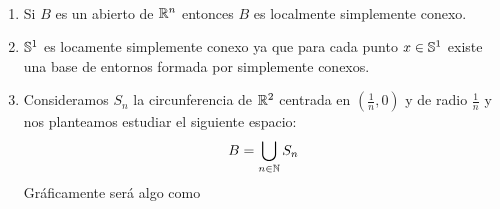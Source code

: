 \begin{ejemplo}\
    \begin{enumerate}
        \item Si $B$ es un abierto de $\mathbb{R}^n$ entonces $B$ es localmente simplemente conexo.

        \item $\mathbb{S}^1$ es locamente simplemente conexo ya que para cada punto $x\in \mathbb{S}^1$ existe una base de entornos formada por simplemente conexos.

        \item Consideramos $S_n$ la circunferencia de $\mathbb{R}^2$ centrada en $\left(\frac{1}{n}, 0\right)$ y de radio $\frac{1}{n}$ y nos planteamos estudiar el siguiente espacio:
        \begin{gather*}
            B = \bigcup\limits_{n\in \mathbb{N}} S_n
        \end{gather*}
        Gráficamente será algo como
        \begin{figure}[H]
            \centering
        \end{figure}


\end{enumerate}
\end{ejemplo}

